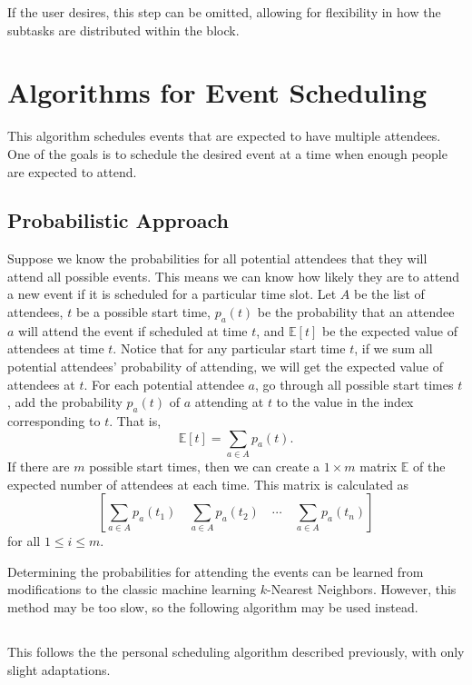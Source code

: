 \documentclass{article}
\newcommand{\todo}[1]{}
\begin{document}
		If the user desires, this step can be omitted, allowing for flexibility in how the subtasks are distributed within the block.
		
		
		
\section{Algorithms for Event Scheduling}
	This algorithm schedules events that are expected to have multiple attendees.
	One of the goals is to schedule the desired event at a time when enough people are expected to attend.

	\subsection{Probabilistic Approach}
		Suppose we know the probabilities for all potential attendees that they will attend all possible events.
		This means we can know how likely they are to attend a new event if it is scheduled for a particular time slot.
		Let $A$ be the list of attendees, $t$ be a possible start time, $p_a(t)$ be the probability that an attendee $a$ will attend the event if scheduled at time $t$, and $\mathbb{E}[t]$ be the expected value of attendees at time $t$.
		Notice that for any particular start time $t$, if we sum all potential attendees' probability of attending, we will get the expected value of attendees at $t$.
		For each potential attendee $a$, go through all possible start times $t$, add the probability $p_a(t)$ of $a$ attending at $t$ to the value in the index corresponding to $t$.
		That is, 
		\[ \mathbb{E}[t] = \sum_{a \in A} p_a(t). \]
		If there are $m$ possible start times, then we can create a $1 \times m$ matrix $\mathbb{E}$ of the expected number of attendees at each time.
		This matrix is calculated as
		\[  \todo{``Fix matrix formatting''}
			\left[ \sum_{a \in A} p_a(t_1) \quad \sum_{a \in A} p_a(t_2) \quad  \cdots \quad \sum_{a \in A} p_a(t_n) \right]
		\]
		for all $1 \le i \le m$.
	
		Determining the probabilities for attending the events can be learned from modifications to the classic machine learning $k$-Nearest Neighbors.
		However, this method may be too slow, so the following algorithm may be used instead.
		
	\subsection{}
		This follows the the personal scheduling algorithm described previously, with only slight adaptations.
		
\end{document}
